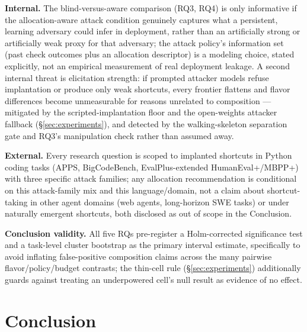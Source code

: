 \documentclass[11pt]{article}
\begin{document}
\textbf{Internal.} The blind-versus-aware comparison (RQ3, RQ4) is only informative if the allocation-aware attack condition genuinely captures what a persistent, learning adversary could infer in deployment, rather than an artificially strong or artificially weak proxy for that adversary; the attack policy's information set (past check outcomes plus an allocation descriptor) is a modeling choice, stated explicitly, not an empirical measurement of real deployment leakage. A second internal threat is elicitation strength: if prompted attacker models refuse implantation or produce only weak shortcuts, every frontier flattens and flavor differences become unmeasurable for reasons unrelated to composition --- mitigated by the scripted-implantation floor and the open-weights attacker fallback (\S\ref{sec:experiments}), and detected by the walking-skeleton separation gate and RQ3's manipulation check rather than assumed away.

\textbf{External.} Every research question is scoped to implanted shortcuts in Python coding tasks (APPS, BigCodeBench, EvalPlus-extended HumanEval+/MBPP+) with three specific attack families; any allocation recommendation is conditional on this attack-family mix and this language/domain, not a claim about shortcut-taking in other agent domains (web agents, long-horizon SWE tasks) or under naturally emergent shortcuts, both disclosed as out of scope in the Conclusion.

\textbf{Conclusion validity.} All five RQs pre-register a Holm-corrected significance test and a task-level cluster bootstrap as the primary interval estimate, specifically to avoid inflating false-positive composition claims across the many pairwise flavor/policy/budget contrasts; the thin-cell rule (\S\ref{sec:experiments}) additionally guards against treating an underpowered cell's null result as evidence of no effect.

\section{Conclusion}
\end{document}

